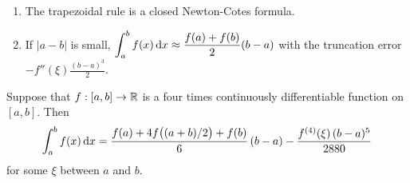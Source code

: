 \begin{rmkList}
\begin{enumerate}
\item The trapezoidal rule is a closed Newton-Cotes formula.
\item If $|a-b|$ is small,
$\displaystyle \int_a^b f(x)\,\mathrm{d}x \approx
\frac{f(a) + f(b)}{2}(b-a)$
with the truncation error\\
$\displaystyle -f''(\xi)\frac{(b-a)^3}{2}$.
\end{enumerate}
\end{rmkList}

\begin{theorem}
Suppose that $f:[a,b]\rightarrow \mathbb{R}$ is a four times continuously
differentiable function on $[a,b]$.  Then
\[
\int_a^b  f(x)\,\mathrm{d}x = \frac{f(a) + 4f\big((a+b)/2\big)
+f(b)}{6}\left(b-a\right) -\frac{f^{(4)}(\xi)\,(b-a)^5}{2880}
\]
for some $\xi$ between $a$ and $b$.
\label{SimpsonRule}
\end{theorem}

